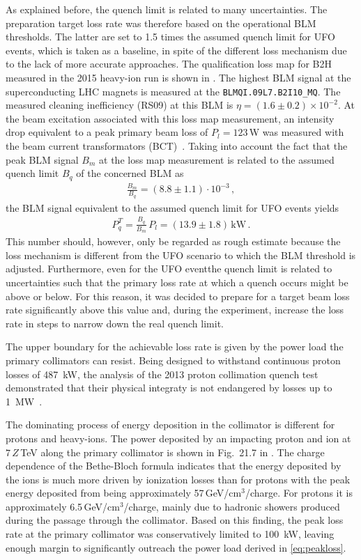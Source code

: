 As explained before, the quench limit is related to many uncertainties. The preparation target loss rate was therefore based on the operational BLM thresholds. The latter are set to 1.5 times the assumed quench limit for UFO events, which is taken as a baseline, in spite of the different loss mechanism due to the lack of more accurate approaches. The qualification loss map for B2H measured in the 2015 heavy-ion run is shown in \figref{}. The highest BLM signal at the superconducting LHC magnets is measured at the \texttt{BLMQI.09L7.B2I10\_MQ}. The measured cleaning inefficiency (RS09) at this BLM is $\eta = (1.6 \pm 0.2) \times 10^{-2}$. At the beam excitation associated with this loss map measurement, an intensity drop equivalent to a peak primary beam loss of $P_l=123\,$W was measured with the beam current transformators (BCT)~\cite{}. Taking into account the fact that the peak BLM signal $B_m$ at the loss map measurement is related to the assumed quench limit $B_q$ of the concerned BLM as
%
\begin{align}
  \frac{B_m}{B_q} = (8.8 \pm 1.1) \cdot 10^{-3} \, ,
\end{align}
the BLM signal equivalent to the assumed quench limit for UFO events yields
%
\begin{align}
  P_q^T = \frac{B_q}{B_m} \, P_l = (13.9 \pm 1.8) \, \text{kW} \, . \label{eq:peakloss}
\end{align}
%
This number should, however, only be regarded as rough estimate because the loss mechanism is different from the UFO scenario to which the BLM threshold is adjusted. Furthermore, even for the UFO eventthe quench limit is related to uncertainties such that the primary loss rate at which a quench occurs might be above or below. For this reason, it was decided to prepare for a target beam loss rate significantly above this value and, during the experiment, increase the loss rate in steps to narrow down the real quench limit. 

The upper boundary for the achievable loss rate is given by the power load the primary collimators can resist. Being designed to withstand continuous proton losses of 487~kW, the analysis of the 2013 proton collimation quench test demonstrated that their physical integraty is not endangered by losses up to 1~MW~\cite{IPAC14:MOPRO043}. 

The dominating process of energy deposition in the collimator is different for protons and heavy-ions. The power deposited by an impacting proton and \lead ion at $7\,Z\,$TeV along the primary collimator is shown in Fig.~21.7 in \citedr. The charge dependence of the Bethe-Bloch formula indicates that the energy deposited by the \lead ions is much more driven by ionization losses than for protons with the peak energy deposited from \lead being approximately 57\,GeV/cm$^3$/charge. For protons it is approximately 6.5\,GeV/cm$^3$/charge, mainly due to hadronic showers produced during the passage through the collimator. Based on this finding, the peak loss rate at the primary collimator was conservatively limited to 100~kW, leaving enough margin to significantly outreach the power load derived in \eqref{eq:peakloss}.

